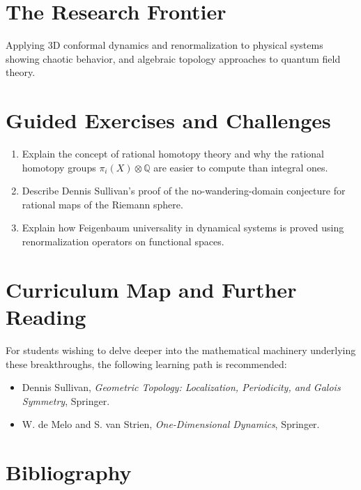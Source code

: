 \section{The Research Frontier}
Applying 3D conformal dynamics and renormalization to physical systems showing chaotic behavior, and algebraic topology approaches to quantum field theory.

\section{Guided Exercises and Challenges}
\begin{enumerate}[label=\textbf{\arabic*.}]
  \item Explain the concept of rational homotopy theory and why the rational homotopy groups $\pi_i(X) \otimes \mathbb{Q}$ are easier to compute than integral ones.
  \item Describe Dennis Sullivan's proof of the no-wandering-domain conjecture for rational maps of the Riemann sphere.
  \item Explain how Feigenbaum universality in dynamical systems is proved using renormalization operators on functional spaces.
\end{enumerate}

\section{Curriculum Map and Further Reading}
For students wishing to delve deeper into the mathematical machinery underlying these breakthroughs, the following learning path is recommended:
\begin{itemize}
  \item Dennis Sullivan, \emph{Geometric Topology: Localization, Periodicity, and Galois Symmetry}, Springer.
  \item W. de Melo and S. van Strien, \emph{One-Dimensional Dynamics}, Springer.
\end{itemize}

\section*{Bibliography}

